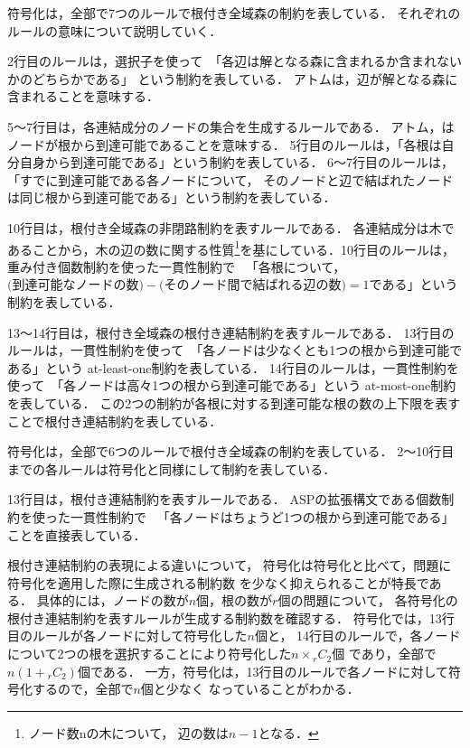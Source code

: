 符号化は，全部で7つのルールで根付き全域森の制約を表している．
それぞれのルールの意味について説明していく．

2行目のルールは，選択子を使って\ 「\!各辺は解となる森に含まれるか含まれないかのどちらかである」
という制約を表している．
アトムは，辺が解となる森に含まれることを意味する．

5～7行目は，各連結成分のノードの集合を生成するルールである．
アトム，はノードが根から到達可能であることを意味する．
5行目のルールは，\!「\!各根は自分自身から到達可能である」という制約を表している．
6～7行目のルールは，\!「\!すでに到達可能である各ノードについて，
そのノードと辺で結ばれたノードは同じ根から到達可能である」という制約を表している．

10行目は，根付き全域森の非閉路制約を表すルールである．
各連結成分は木であることから，木の辺の数に関する性質\footnote{ノード数nの木について，%
辺の数は$n - 1$となる．}を基にしている．10行目のルールは，重み付き個数制約を使った一貫性制約で
\ 「\!各根について，$\mbox{(到達可能なノードの数)}-\mbox{(そのノード間で結ばれる辺の数)}=1$である」という制約を表している．

13～14行目は，根付き全域森の根付き連結制約を表すルールである．
13行目のルールは，一貫性制約を使って\ 「\!各ノードは少なくとも1つの根から到達可能である」という
at-least-one制約を表している．
14行目のルールは，一貫性制約を使って\ 「\!各ノードは高々1つの根から到達可能である」という
at-most-one制約を表している．
この2つの制約が各根に対する到達可能な根の数の上下限を表すことで根付き連結制約を表している．

符号化は，全部で6つのルールで根付き全域森の制約を表している．
2～10行目までの各ルールは符号化と同様にして制約を表している．

13行目は，根付き連結制約を表すルールである．
ASPの拡張構文である個数制約を使った一貫性制約で
\ 「\!各ノードはちょうど1つの根から到達可能である」ことを直接表している．

根付き連結制約の表現による違いについて，
符号化は符号化と比べて，問題に符号化を適用した際に生成される制約数
を少なく抑えられることが特長である．
具体的には，ノードの数が$n$個，根の数が$r$個の問題について，
各符号化の根付き連結制約を表すルールが生成する制約数を確認する．
符号化では，13行目のルールが各ノードに対して符号化した$n$個と，
14行目のルールで，各ノードについて2つの根を選択することにより符号化した$n\times{}_rC_2$個
であり，全部で$n(1+{}_rC_2)$個である．
一方，符号化は，13行目のルールで各ノードに対して符号化するので，全部で$n$個と少なく
なっていることがわかる．



